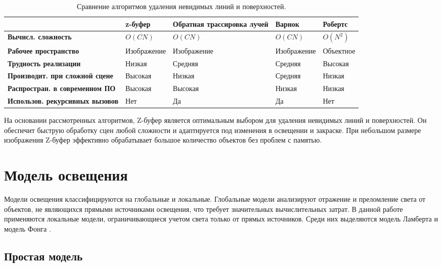 \begin{table}[h!]
	\centering
	\caption{\raggedleft Сравнение алгоритмов удаления невидимых линий и поверхностей.}\label{table:1}
	\begin{tabularx}{\textwidth}{|X|X|X|X|X|}
		\hline
		& \textbf{z-буфер} & \textbf{Обратная трассировка лучей} & \textbf{Варнок} & \textbf{Робертс} \\
		\hline
		\textbf{Вычисл. сложность} & $O(CN)$ & $O(CN)$ & $O(CN)$ & $O(N^2)$ \\
		\hline
		\textbf{Рабочее пространство} & Изображение & Изображение & Изображение & Объектное \\
		\hline
		\textbf{Трудность \newline реализации} & Низкая & Средняя & Средняя & Высокая \\
		\hline
		\textbf{Производит. при сложной сцене} & Высокая & Низкая & Средняя & Низкая \\
		\hline
		\textbf{Распростран. в современном ПО} & Высокая & Высокая & Низкая & Низкая \\
		\hline
		\textbf{Использов. рекурсивных вызовов} & Нет & Да & Да & Нет \\
		\hline
	\end{tabularx}
\end{table}

На основании рассмотренных алгоритмов, Z-буфер является оптимальным выбором для удаления невидимых линий и поверхностей. Он обеспечит быструю обработку сцен любой сложности и адаптируется под изменения в освещении и закраске. При небольшом размере изображения Z-буфер эффективно обрабатывает большое количество объектов без проблем с памятью. 

\section{Модель освещения}

Модели освещения классифицируются на глобальные и локальные. Глобальные модели анализируют отражение и преломление света от объектов, не являющихся прямыми источниками освещения, что требует значительных вычислительных затрат. В данной работе применяются локальные модели, ограничивающиеся учетом света только от прямых источников. Среди них выделяются модель Ламберта и модель Фонга \cite{lightmodfv}.


\subsection{Простая модель}

